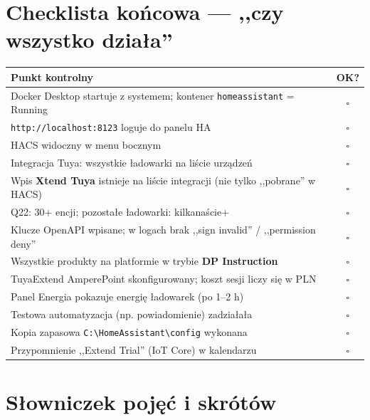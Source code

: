 \documentclass[11pt,a4paper]{article}
\begin{document}
\section{Checklista końcowa --- ,,czy wszystko działa''}

\begin{center}
\begin{tabular}{>{\raggedright\arraybackslash}p{11.2cm} c}
\toprule
\textbf{Punkt kontrolny} & \textbf{OK?}\\
\midrule
Docker Desktop startuje z systemem; kontener \texttt{homeassistant} = Running & $\square$\\
\texttt{http://localhost:8123} loguje do panelu HA & $\square$\\
HACS widoczny w menu bocznym & $\square$\\
Integracja Tuya: wszystkie ładowarki na liście urządzeń & $\square$\\
Wpis \textbf{Xtend Tuya} istnieje na liście integracji (nie tylko ,,pobrane'' w HACS) & $\square$\\
Q22: 30+ encji; pozostałe ładowarki: kilkanaście+ & $\square$\\
Klucze OpenAPI wpisane; w logach brak ,,sign invalid'' / ,,permission deny'' & $\square$\\
Wszystkie produkty na platformie w trybie \textbf{DP Instruction} & $\square$\\
TuyaExtend AmperePoint skonfigurowany; koszt sesji liczy się w PLN & $\square$\\
Panel Energia pokazuje energię ładowarek (po 1--2 h) & $\square$\\
Testowa automatyzacja (np. powiadomienie) zadziałała & $\square$\\
Kopia zapasowa \texttt{C:\textbackslash HomeAssistant\textbackslash config} wykonana & $\square$\\
Przypomnienie ,,Extend Trial'' (IoT Core) w kalendarzu & $\square$\\
\bottomrule
\end{tabular}
\end{center}

\section{Słowniczek pojęć i skrótów}
\label{sec:slowniczek}
\end{document}
